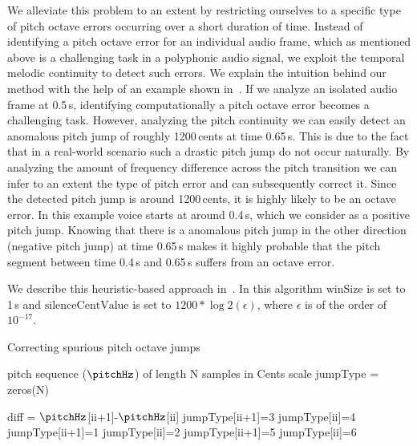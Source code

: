 {We alleviate this problem to an extent by restricting ourselves to a specific type of pitch octave errors occurring over a short duration of time. Instead of identifying a pitch octave error for an individual audio frame, which as mentioned above is a challenging task in a polyphonic audio signal, we exploit the temporal melodic continuity to detect such errors. We explain the intuition behind our method with the help of an example shown in~. If we analyze an isolated audio frame at 0.5\,s, identifying computationally a pitch octave error becomes a challenging task. However, analyzing the pitch continuity we can easily detect an anomalous pitch jump of roughly 1200\,cents at time 0.65\,s. This is due to the fact that in a real-world scenario such a drastic pitch jump do not occur naturally. By analyzing the amount of frequency difference across the pitch transition we can infer to an extent the type of pitch error and can subsequently correct it. Since the detected pitch jump is around 1200\,cents, it is highly likely to be an octave error. In this example voice starts at around 0.4\,s, which we consider as a positive pitch jump. Knowing that there is a anomalous pitch jump in the other direction (negative pitch jump) at time 0.65\,s makes it highly probable that the pitch segment between time 0.4\,s and 0.65\,s suffers from an octave error.  

We describe this heuristic-based approach in~. In this algorithm $\mathrm{winSize}$ is set to 1\,s and $\mathrm{silenceCentValue}$ is set to $1200*\log2(\epsilon)$, where $\epsilon$ is of the order of $10^{-17}$.


\renewcommand{\algorithmiccomment}[1]{\bgroup\hfill\tiny//~#1\egroup}

\begin{algorithm}
	\caption{Correcting spurious pitch octave jumps}
	\label{alg:algorithmPitchCorrection}
	\begin{algorithmic}  
		 pitch sequence ($\pitchHz$) of length N samples in Cents scale
		\State jumpType = zeros(N)	
		
									
		\State diff = $\pitchHz$[ii+1]-$\pitchHz$[ii]
		\State jumpType[ii+1]=3			
		\State jumpType[ii]=4			
		\EndIf
		\State jumpType[ii+1]=1			
		\State jumpType[ii]=2			
		\State jumpType[ii+1]=5			
		\Else
		\State jumpType[ii]=6			
		\EndIf
		\EndIf
		\EndFor
		

\end{algorithmic}
\end{algorithm}}
